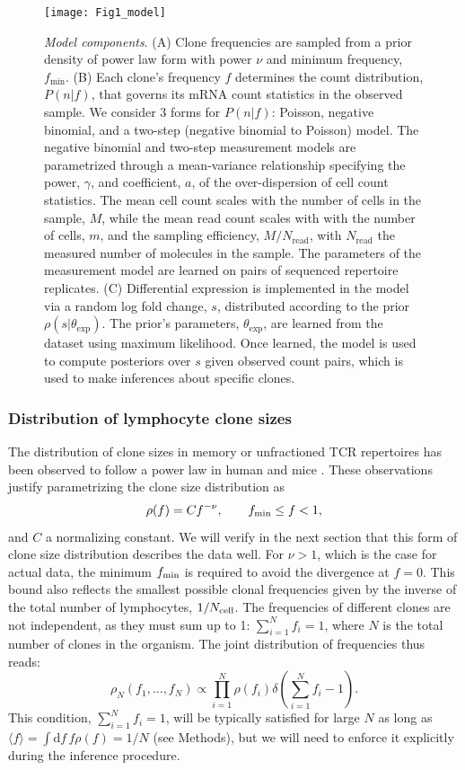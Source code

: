 \documentclass[pre,twocolumn,english,longbibliography]{revtex4}
\newcommand{\beq}{\begin{equation}}
\newcommand{\eeq}{\end{equation}}
\newcommand{\<}{\langle}
\renewcommand{\>}{\rangle}
\begin{document}
\begin{figure}
\texttt{[image: Fig1\_model]}
\centering{}
\caption{
\emph{Model components}. (A) Clone frequencies are sampled from a prior density of power law form with power $\nu$ and minimum frequency, $f_\textrm{min}$. (B) Each clone's frequency $f$ determines the count distribution, $P(n|f)$, that governs its mRNA count statistics in the observed sample. We consider 3 forms for $P(n|f)$: Poisson, negative binomial, and a two-step (negative binomial to Poisson) model. The negative binomial and two-step measurement models are parametrized through a mean-variance relationship specifying the power, $\gamma$, and coefficient, $a$, of the over-dispersion of cell count statistics. The mean cell count scales with the number of cells in the sample, $M$, while the mean read count scales with with the number of cells, $m$, and the sampling efficiency, $M/N_{\textrm{read}}$, with $N_{\textrm{read}}$ the measured number of molecules in the sample. The parameters of the measurement model are learned on pairs of sequenced repertoire replicates.  (C) Differential expression is implemented in the model via a random log fold change, $s$, distributed according to the prior $\rho(s|\theta_\textrm{exp})$. The prior's parameters, $\theta_\textrm{exp}$, are learned from the dataset using maximum likelihood. Once learned, the model is used to compute posteriors over $s$ given observed count pairs, which is used to make inferences about specific clones.
\label{fig:fullmodel}}
\end{figure}

\subsubsection*{Distribution of lymphocyte clone sizes}

The distribution of clone sizes in memory or unfractioned TCR repertoires has been observed to follow a power law in human \cite{Mora2016e,Gerritsen_thesis,Greef2019} and mice \cite{Zarnitsyna2013,Heather2017}. These observations justify parametrizing the clone size distribution as
\beq
\rho(f)=Cf^{-\nu}, \qquad f_{\rm min}\leq f<1,
\eeq
and $C$ a normalizing constant. 
We will verify in the next section that this form of clone size distribution describes the data well.
For $\nu>1$, which is the case for actual data, the minimum $f_{\rm min}$ is required to avoid the divergence at $f=0$. This bound also reflects the smallest possible clonal frequencies given by the inverse of the total number of lymphocytes, $1/N_{\rm cell}$. The frequencies of different clones are not independent, as they must sum up to 1: $\sum_{i=1}^Nf_i=1$, where $N$ is the total number of clones in the organism. The joint distribution of frequencies thus reads:
\beq
\rho_N(f_1,\ldots,f_N)\propto\prod_{i=1}^N\rho(f_i)\delta\left(\sum_{i=1}^Nf_i-1\right).
\eeq
This condition, $\sum_{i=1}^Nf_i=1$, will be typically satisfied for large $N$ as long as $\<f\>=\int \textrm{d}f \,f\rho(f) = 1/N$ (see Methods), but we will need to enforce it explicitly during the inference procedure. 
\end{document}
